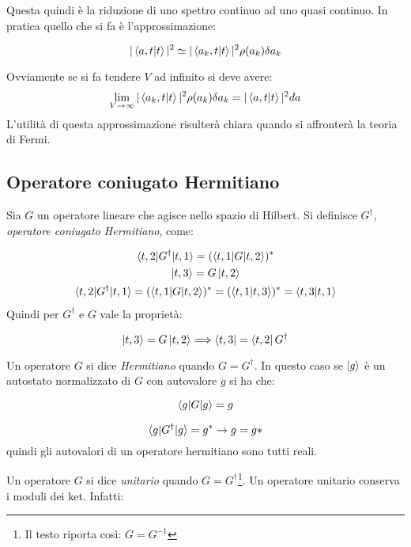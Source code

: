Questa quindi è la riduzione di uno spettro continuo ad uno quasi continuo. In
pratica quello che si fa è l'approssimazione:

\begin{equation}
|\braket{a,t|t}|^2\simeq |\braket{a_k,t|t}|^2\rho(a_k)\delta a_k
\end{equation}

Ovviamente se si fa tendere $V$ ad infinito si deve avere:
\begin{equation}
\lim_{V\to\infty}|\braket{a_k,t|t}|^2\rho(a_k)\delta a_k = |\braket{a,t|t}|^2da
\end{equation}
L'utilità di questa approssimazione risulterà chiara quando si affronterà la 
teoria di Fermi.

\subsection{Operatore coniugato Hermitiano}
Sia $G$ un operatore lineare che agisce nello spazio di Hilbert. Si definisce 
$G^\dag$, \textit{operatore coniugato Hermitiano}, come:

\begin{gather}
\braket{t,2|G^{\dag}|t,1}=(\braket{t,1|G|t,2})^*\\
\ket{t,3}=G\ket{t,2}\\
\braket{t,2|G^{\dag}|t,1}=(\braket{t,1|G|t,2})^*=(\braket{t,1|t,3})^*=\braket{t,
3|t,1}
\end{gather}
Quindi per $G^{\dag}$ e $G$ vale la proprietà:

\begin{equation}
\ket{t,3}=G\ket{t,2} \Longrightarrow \bra{t,3}=\bra{t,2}G^{\dag}
\end{equation}

Un operatore $G$ si dice \textit{Hermitiano} quando $G=G^{\dag}$. In questo 
caso se $\ket{g}$ è un autostato normalizzato di $G$ con autovalore $g$ si ha 
che:

\begin{equation}
\braket{g|G|g}=g 
\end{equation}

\begin{equation}
\braket{g|G^{\dag}|g}=g^*\rightarrow g=g*
\end{equation}
quindi gli autovalori di un operatore hermitiano sono tutti reali.

Un operatore $G$ si dice \textit{unitario} quando $G=G^{\dag}$\footnote{Il 
testo riporta così: $G=G^{-1}$}. Un operatore unitario conserva i moduli dei 
ket. Infatti:

